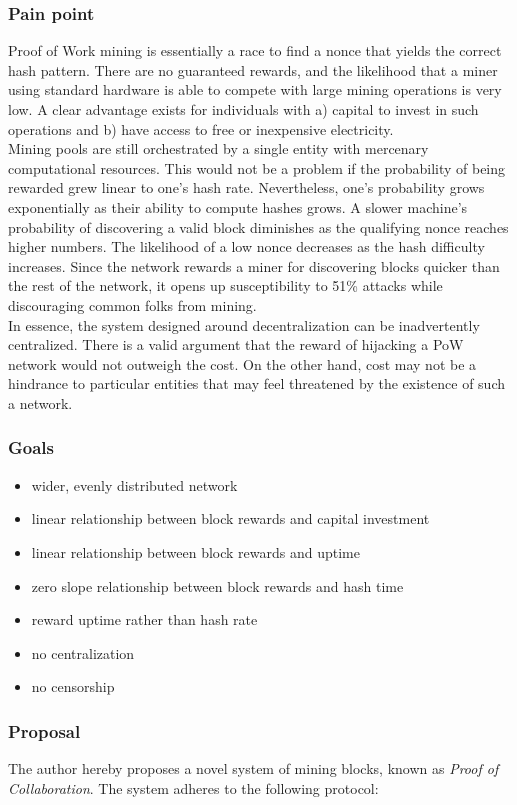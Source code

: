 \documentclass[10pt,twocolumn]{article}
\begin{document}
\subsubsection{Pain point}
Proof of Work mining is essentially a race to find a nonce that yields the correct hash pattern. 
There are no guaranteed rewards, and the likelihood that a miner using standard hardware is able to compete with large mining operations is very low. A clear advantage exists for individuals with a) capital to invest in such operations and b) have access to free or inexpensive electricity. \\
Mining pools are still orchestrated by a single entity with mercenary computational resources.
This would not be a problem if the probability of being rewarded grew linear to one's hash rate. Nevertheless, one’s probability grows exponentially as their ability to compute hashes grows. A slower machine's probability of discovering a valid block diminishes as the qualifying nonce reaches higher numbers. The likelihood of a low nonce decreases as the hash difficulty increases. Since the network rewards a miner for discovering blocks quicker than the rest of the network, it opens up susceptibility to 51\% attacks\cite{btcwiki:weaknesses} while discouraging common folks from mining.\\
In essence, the system designed around decentralization can be inadvertently centralized. There is a valid argument that the reward of hijacking a PoW network would not outweigh the cost\cite{btcwiki:weaknesses}. On the other hand, cost may not be a hindrance to particular entities that may feel threatened by the existence of such a network.
\subsubsection{Goals}
\begin{itemize}
\item wider, evenly distributed network
\item linear relationship between block rewards and capital investment
\item linear relationship between block rewards and uptime
\item zero slope relationship between block rewards and hash time
\item reward uptime rather than hash rate
\item no centralization
\item no censorship
\end{itemize}
\subsubsection{Proposal}
The author hereby proposes a novel system of mining blocks, known as \textit{Proof of Collaboration}.  The system adheres to the following protocol:
\end{document}
